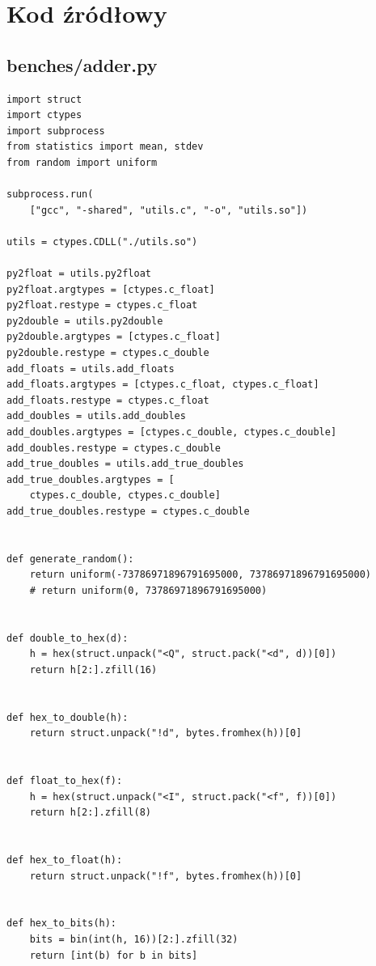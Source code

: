 \documentclass{article}
\begin{document}

\section{Kod źródłowy}

\subsection{benches/adder.py}

\begin{lstlisting}
import struct
import ctypes
import subprocess
from statistics import mean, stdev
from random import uniform

subprocess.run(
    ["gcc", "-shared", "utils.c", "-o", "utils.so"])

utils = ctypes.CDLL("./utils.so")

py2float = utils.py2float
py2float.argtypes = [ctypes.c_float]
py2float.restype = ctypes.c_float
py2double = utils.py2double
py2double.argtypes = [ctypes.c_float]
py2double.restype = ctypes.c_double
add_floats = utils.add_floats
add_floats.argtypes = [ctypes.c_float, ctypes.c_float]
add_floats.restype = ctypes.c_float
add_doubles = utils.add_doubles
add_doubles.argtypes = [ctypes.c_double, ctypes.c_double]
add_doubles.restype = ctypes.c_double
add_true_doubles = utils.add_true_doubles
add_true_doubles.argtypes = [
    ctypes.c_double, ctypes.c_double]
add_true_doubles.restype = ctypes.c_double


def generate_random():
    return uniform(-73786971896791695000, 73786971896791695000)
    # return uniform(0, 73786971896791695000)


def double_to_hex(d):
    h = hex(struct.unpack("<Q", struct.pack("<d", d))[0])
    return h[2:].zfill(16)


def hex_to_double(h):
    return struct.unpack("!d", bytes.fromhex(h))[0]


def float_to_hex(f):
    h = hex(struct.unpack("<I", struct.pack("<f", f))[0])
    return h[2:].zfill(8)


def hex_to_float(h):
    return struct.unpack("!f", bytes.fromhex(h))[0]


def hex_to_bits(h):
    bits = bin(int(h, 16))[2:].zfill(32)
    return [int(b) for b in bits]



\end{lstlisting}
\end{document}
